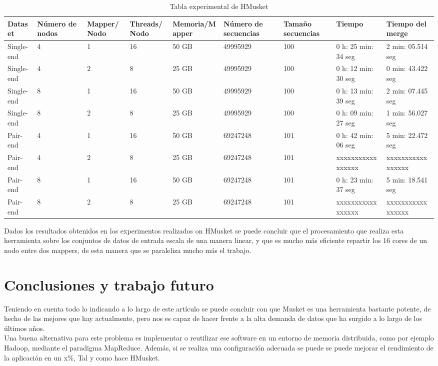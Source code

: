\documentclass[conference]{IEEEtran}
\begin{document}
\begin{table}[]
	\caption{Tabla experimental de HMusket}
	\label{hmusket_experiment_result}
	\begin{tabular}{|p{1.3cm}|p{1cm}|l|l|l|p{1.5cm}|p{1.5cm}|p{2.2cm}|p{2.2cm}|}
		\hline
		\textbf{Dataset} &	\textbf{Número de nodos} & \textbf{Mapper/Nodo} & \textbf{Threads/Nodo} & \textbf{Memoria/Mapper} & \textbf{Número de secuencias} & \textbf{Tamaño secuencias} & \textbf{Tiempo} & \textbf{Tiempo del merge}	\\ \hline
		Single-end &	4 & 1 & 16 & 50 GB & 49995929 & 100 & 0 h: 25 min: 34 seg	& 2 min: 05.514 seg	\\ \hline
		Single-end &	4 & 2 & 8 & 25 GB & 49995929 & 100 & 0 h: 12 min: 30 seg	& 0 min: 43.422 seg	\\ \hline
		Single-end &	8 & 1 & 16 & 50 GB & 49995929 & 100 & 0 h: 13 min: 39 seg	& 2 min: 07.445 seg	\\ \hline
		Single-end &	8 & 2 & 8 & 25 GB & 49995929 & 100 & 0 h: 09 min: 27 seg	& 1 min: 56.027 seg	\\ \hline \hline
		Pair-end &	4 & 1 & 16 & 50 GB & 69247248 & 101 & 0 h: 42 min: 06 seg	& 5 min: 22.472 seg	\\ \hline
		Pair-end &	4 & 2 & 8 & 25 GB & 69247248 & 101 & xxxxxxxxxxxxxxxxx	& xxxxxxxxxxxxxxxxx	\\ \hline
		Pair-end &	8 & 1 & 16 & 50 GB & 69247248 & 101 & 0 h: 23 min: 37 seg	& 5 min: 18.541 seg	\\ \hline
		Pair-end &	8 & 2 & 8 & 25 GB & 69247248 & 101 & xxxxxxxxxxxxxxxxx	& xxxxxxxxxxxxxxxxx \\ \hline
	\end{tabular}
\end{table}

Dados los resultados obtenidos en los experimentos realizados on HMusket se puede concluir que el procesamiento que realiza esta herramienta sobre los conjuntos de datos de entrada escala de una manera linear, y que es mucho más eficiente repartir los 16 cores de un nodo entre dos mappers, de esta manera que se paraleliza mucho más el trabajo.\\

\section{Conclusiones y trabajo futuro}
Teniendo en cuenta todo lo indicando a lo largo de este artículo se puede concluir con que Musket es una herramienta bastante potente, de hecho de las mejores que hay actualmente, pero nos es capaz de hacer frente a la alta demanda de datos que ha surgido a lo largo de los últimos años.\\
Una buena alternativa para este problema es implementar o reutilizar ese software en un entorno de memoria distribuida, como por ejemplo Hadoop, mediante el paradigma MapReduce. Además, si se realiza una configuración adecuada se puede se puede mejorar el rendimiento de la aplicación en un x\%, Tal y como hace HMusket.\\
\end{document}

